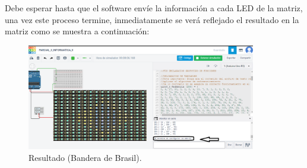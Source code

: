 \documentclass{article}
\begin{document}
\\
\\
Debe esperar hasta que el software envíe la información a cada LED de la matriz, una vez este proceso termine, inmediatamente se verá reflejado el resultado en la matriz como se muestra a continuación:
\begin{figure}[h]
  \includegraphics[width=10cm]{resultado.PNG}
  \centering
  \caption{Resultado (Bandera de Brasil).}
  \label{fig:Resultado}
\end{figure}


\end{document}
